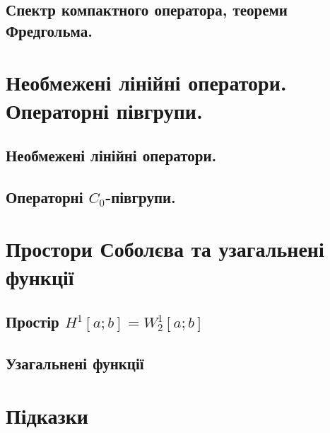 \documentclass[12pt]{report}
\begin{document}
        \section{Спектр компактного оператора, теореми Фредгольма.}
            
            
            
            \newpage
    \chapter{Необмежені лінійні оператори. Операторні півгрупи.}
        \section{Необмежені лінійні оператори.}
            
            
            
            \newpage
        \section{Операторні \texorpdfstring{$C_0$}{C0}-півгрупи.}
            
            
            
            
            \newpage
    \chapter{Простори Соболєва та узагальнені функції}
        \section{Простір \texorpdfstring{$H^1[a;b] = W_2^1[a;b]$}{H1[a;b] = W21[a;b]}}
            
            \newpage
        \section{Узагальнені функції}
            
            
        \newpage
    \chapter*{Підказки}
        
\end{document}
